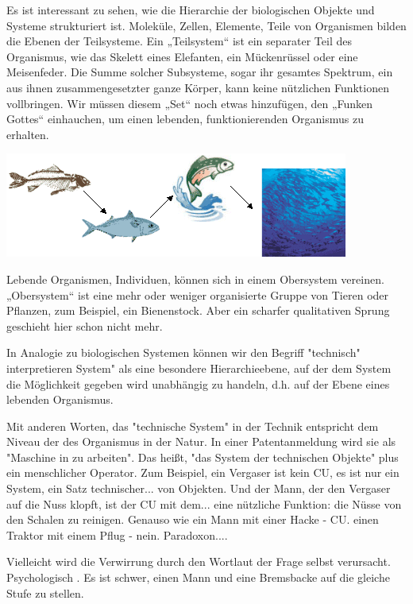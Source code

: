 \documentclass[11pt,a4paper]{article}
\begin{document}
Es ist interessant zu sehen, wie die Hierarchie der biologischen Objekte und
Systeme strukturiert ist. Moleküle, Zellen, Elemente, Teile von Organismen
bilden die Ebenen der Teilsysteme.  Ein „Teilsystem“ ist ein separater Teil
des Organismus, wie das Skelett eines Elefanten, ein Mückenrüssel oder eine
Meisenfeder. Die Summe solcher Subsysteme, sogar ihr gesamtes Spektrum, ein
aus ihnen zusammengesetzter ganze Körper, kann keine nützlichen Funktionen
vollbringen.  Wir müssen diesem „Set“ noch etwas hinzufügen, den „Funken
Gottes“ einhauchen, um einen lebenden, funktionierenden Organismus zu
erhalten.
\begin{center}
 \includegraphics[width=.6\textwidth]{mts-2.png}
\end{center}

Lebende Organismen, Individuen, können sich in einem Obersystem vereinen.
„Obersystem“ ist eine mehr oder weniger organisierte Gruppe von Tieren oder
Pflanzen, zum Beispiel, ein Bienenstock. Aber ein scharfer
qualitativen Sprung geschieht hier schon nicht mehr. 

In Analogie zu biologischen Systemen können wir den Begriff "technisch"
interpretieren System" als eine besondere Hierarchieebene, auf der dem System
die Möglichkeit gegeben wird unabhängig zu handeln, d.h. auf der Ebene eines
lebenden Organismus.


Mit anderen Worten, das "technische System" in der Technik entspricht dem Niveau der
des Organismus in der Natur. In einer Patentanmeldung wird sie als "Maschine in
zu arbeiten". Das heißt, "das System der technischen Objekte" plus ein menschlicher Operator. Zum Beispiel,
ein Vergaser ist kein CU, es ist nur ein System, ein Satz technischer...
von Objekten. Und der Mann, der den Vergaser auf die Nuss klopft, ist der CU mit dem...
eine nützliche Funktion: die Nüsse von den Schalen zu reinigen. Genauso wie ein Mann mit einer Hacke - CU.
einen Traktor mit einem Pflug - nein. Paradoxon....


Vielleicht wird die Verwirrung durch den Wortlaut der Frage selbst verursacht. Psychologisch .
Es ist schwer, einen Mann und eine Bremsbacke auf die gleiche Stufe zu stellen.
\end{document}
